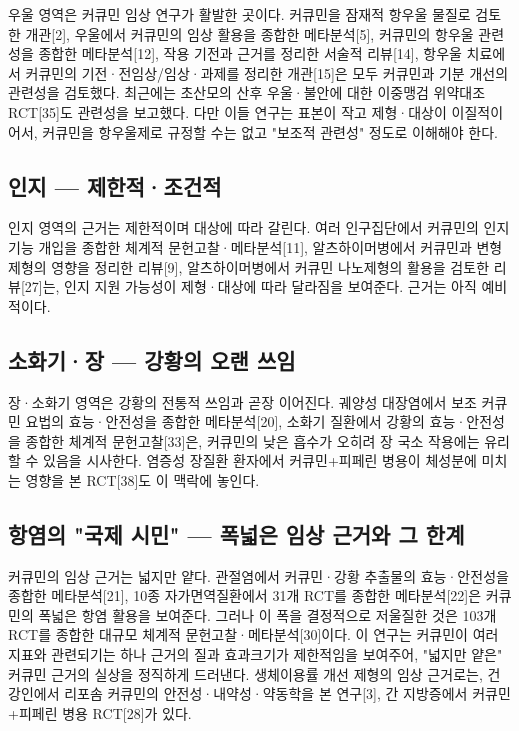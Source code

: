 \documentclass[12pt,oneside]{book}
\begin{document}
우울 영역은 커큐민 임상 연구가 활발한 곳이다. 커큐민을 잠재적 항우울 물질로 검토한 개관[2], 우울에서 커큐민의 임상 활용을 종합한 메타분석[5], 커큐민의 항우울 관련성을 종합한 메타분석[12], 작용 기전과 근거를 정리한 서술적 리뷰[14], 항우울 치료에서 커큐민의 기전·전임상/임상·과제를 정리한 개관[15]은 모두 커큐민과 기분 개선의 관련성을 검토했다. 최근에는 초산모의 산후 우울·불안에 대한 이중맹검 위약대조 RCT[35]도 관련성을 보고했다. 다만 이들 연구는 표본이 작고 제형·대상이 이질적이어서, 커큐민을 항우울제로 규정할 수는 없고 "보조적 관련성" 정도로 이해해야 한다.

\subsection{인지 — 제한적·조건적}

인지 영역의 근거는 제한적이며 대상에 따라 갈린다. 여러 인구집단에서 커큐민의 인지 기능 개입을 종합한 체계적 문헌고찰·메타분석[11], 알츠하이머병에서 커큐민과 변형 제형의 영향을 정리한 리뷰[9], 알츠하이머병에서 커큐민 나노제형의 활용을 검토한 리뷰[27]는, 인지 지원 가능성이 제형·대상에 따라 달라짐을 보여준다. 근거는 아직 예비적이다.

\subsection{소화기·장 — 강황의 오랜 쓰임}

장·소화기 영역은 강황의 전통적 쓰임과 곧장 이어진다. 궤양성 대장염에서 보조 커큐민 요법의 효능·안전성을 종합한 메타분석[20], 소화기 질환에서 강황의 효능·안전성을 종합한 체계적 문헌고찰[33]은, 커큐민의 낮은 흡수가 오히려 장 국소 작용에는 유리할 수 있음을 시사한다. 염증성 장질환 환자에서 커큐민+피페린 병용이 체성분에 미치는 영향을 본 RCT[38]도 이 맥락에 놓인다.

\subsection{항염의 "국제 시민" — 폭넓은 임상 근거와 그 한계}

커큐민의 임상 근거는 넓지만 얕다. 관절염에서 커큐민·강황 추출물의 효능·안전성을 종합한 메타분석[21], 10종 자가면역질환에서 31개 RCT를 종합한 메타분석[22]은 커큐민의 폭넓은 항염 활용을 보여준다. 그러나 이 폭을 결정적으로 저울질한 것은 103개 RCT를 종합한 대규모 체계적 문헌고찰·메타분석[30]이다. 이 연구는 커큐민이 여러 지표와 관련되기는 하나 근거의 질과 효과크기가 제한적임을 보여주어, "넓지만 얕은" 커큐민 근거의 실상을 정직하게 드러낸다. 생체이용률 개선 제형의 임상 근거로는, 건강인에서 리포솜 커큐민의 안전성·내약성·약동학을 본 연구[3], 간 지방증에서 커큐민+피페린 병용 RCT[28]가 있다.
\end{document}
